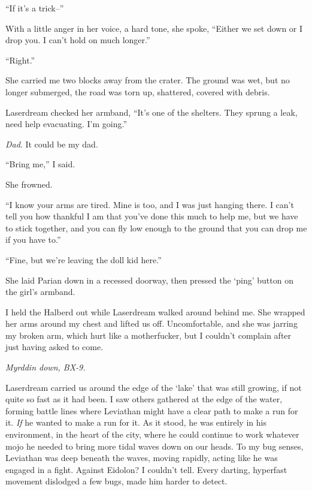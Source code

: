 ``If it's a trick--''



With a little anger in her voice, a hard tone, she spoke, ``Either we set down or I drop you.  I can't hold on much longer.''



``Right.''



She carried me two blocks away from the crater.  The ground was wet, but no longer submerged, the road was torn up, shattered, covered with debris.



Laserdream checked her armband, ``It's one of the shelters.  They sprung a leak, need help evacuating.  I'm going.''



\emph{Dad}.  It could be my dad.



``Bring me,'' I said.



She frowned.



``I know your arms are tired.  Mine is too, and I was just hanging there.  I can't tell you how thankful I am that you've done this much to help me, but we have to stick together, and you can fly low enough to the ground that you can drop me if you have to.''



``Fine, but we're leaving the doll kid here.''



She laid Parian down in a recessed doorway, then pressed the `ping' button on the girl's armband.



I held the Halberd out while Laserdream walked around behind me.  She wrapped her arms around my chest and lifted us off.  Uncomfortable, and she was jarring my broken arm, which hurt like a motherfucker, but I couldn't complain after just having asked to come.



\emph{Myrddin down, BX-9.}



Laserdream carried us around the edge of the `lake' that was still growing, if not quite so fast as it had been.  I saw others gathered at the edge of the water, forming battle lines where Leviathan might have a clear path to make a run for it. \emph{If} he wanted to make a run for it.  As it stood, he was entirely in his environment, in the heart of the city, where he could continue to work whatever mojo he needed to bring more tidal waves down on our heads.  To my bug senses, Leviathan was deep beneath the waves, moving rapidly, acting like he was engaged in a fight.  Against Eidolon?  I couldn't tell.  Every darting, hyperfast movement dislodged a few bugs, made him harder to detect.



